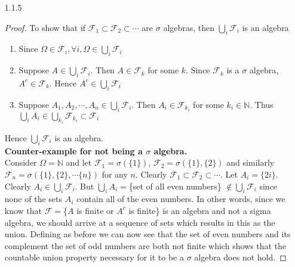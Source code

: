 \documentclass[a4paper,english,10pt]{article}
\begin{document}
\begin{enumerate}
\item[1.1.5]
\begin{proof}
To show that if $\mathcal{F}_1 \subset \mathcal{F}_2 \subset \cdots$ are $\sigma$ algebras, then $\bigcup_i\mathcal{F}_i$ is an algebra
\begin{enumerate}
\item Since $\Omega \in \mathcal{F}_i, \forall i, \Omega \in \bigcup_i \mathcal{F}_i$  
\item Suppose $A \in \bigcup_i\mathcal{F}_i$. Then $A\in \mathcal{F}_k$ for some $k$. Since $\mathcal{F}_k$ is a $\sigma$ algebra, $A^c \in \mathcal{F}_k$. Hence $A^c \in \bigcup_i\mathcal{F}_i$
\item Suppose $A_1,A_2,\cdots,A_n \in \bigcup_i\mathcal{F}_i$. Then $A_i \in \mathcal{F}_{k_i}$ for some $k_i \in \mathbb{N}$. Thus $\bigcup_i A_i \in \bigcup_{k_i}\mathcal{F}_{k_i} \subset \mathcal{F}_i$
\end{enumerate}
Hence $\bigcup_i\mathcal{F}_i$ is an algebra.\\
\textbf{Counter-example for not being a $\sigma$ algebra.}\\
Consider $\Omega=\mathbb{N}$ and let $\mathcal{F}_1=\sigma(\{1\})$, $\mathcal{F}_2=\sigma(\{1\},\{2\})$ and similarly $\mathcal{F}_n=\sigma(\{1\},\{2\},\cdots \{n\})$ for any $n$. Clearly $\mathcal{F}_1 \subset \mathcal{F}_2 \subset \cdots$. Let $A_i=\{2i\}$. Clearly $A_i \in \bigcup_i\mathcal{F}_i$. But $\bigcup_iA_i=$\{set of all even numbers\} $\notin \bigcup_i\mathcal{F}_i$ since none of the sets $A_i$ contain all of the even numbers. In other words, since we know that $\mathcal{F}=$\{$A$ is finite or $A^c$ is finite\} is an algebra and not a sigma algebra, we should arrive at a sequence of sets which results in this as the union. Defining as before we can now see that the set of even numbers and its complement the set of odd numbers are both not finite which shows that the countable union property necessary for it to be a $\sigma$ algebra does not hold. 
\end{proof}


\end{enumerate}
\end{document}
